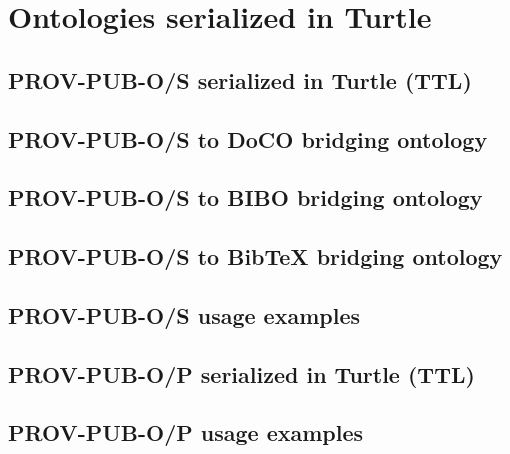  
\appendix    %

\chapter{Ontologies serialized in Turtle}
\label{ap:ontologies}
\section{PROV-PUB-O/S serialized in Turtle (TTL)}

\section{PROV-PUB-O/S to DoCO bridging ontology}

\section{PROV-PUB-O/S to BIBO bridging ontology}

\section{PROV-PUB-O/S to BibTeX bridging ontology}

\section{PROV-PUB-O/S usage examples}

\section{PROV-PUB-O/P serialized in Turtle (TTL)}

\section{PROV-PUB-O/P usage examples}


